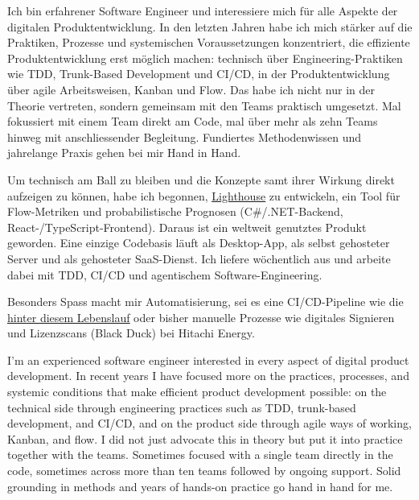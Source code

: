 {
}


\begin{cvparagraph}
\sloppy

{
	Ich bin erfahrener Software Engineer und interessiere mich für alle Aspekte der digitalen Produktentwicklung. In den letzten Jahren habe ich mich stärker auf die Praktiken, Prozesse und systemischen Voraussetzungen konzentriert, die effiziente Produktentwicklung erst möglich machen: technisch über Engineering-Praktiken wie TDD, Trunk-Based Development und CI/CD, in der Produktentwicklung über agile Arbeitsweisen, Kanban und Flow. Das habe ich nicht nur in der Theorie vertreten, sondern gemeinsam mit den Teams praktisch umgesetzt. Mal fokussiert mit einem Team direkt am Code, mal über mehr als zehn Teams hinweg mit anschliessender Begleitung. Fundiertes Methodenwissen und jahrelange Praxis gehen bei mir Hand in Hand.

	Um technisch am Ball zu bleiben und die Konzepte samt ihrer Wirkung direkt aufzeigen zu können, habe ich begonnen, \underline{\href{https://letpeople.work/lighthouse}{Lighthouse}} zu entwickeln, ein Tool für Flow-Metriken und probabilistische Prognosen (C\#/.NET-Backend, React-/TypeScript-Frontend). Daraus ist ein weltweit genutztes Produkt geworden. Eine einzige Codebasis läuft als Desktop-App, als selbst gehosteter Server und als gehosteter SaaS-Dienst. Ich liefere wöchentlich aus und arbeite dabei mit TDD, CI/CD und agentischem Software-Engineering.

	Besonders Spass macht mir Automatisierung, sei es eine CI/CD-Pipeline wie die \underline{\href{https://github.com/huserben/cv/actions}{hinter diesem Lebenslauf}} oder bisher manuelle Prozesse wie digitales Signieren und Lizenzscans (Black Duck) bei Hitachi Energy.
}
{
	I'm an experienced software engineer interested in every aspect of digital product development. In recent years I have focused more on the practices, processes, and systemic conditions that make efficient product development possible: on the technical side through engineering practices such as TDD, trunk-based development, and CI/CD, and on the product side through agile ways of working, Kanban, and flow. I did not just advocate this in theory but put it into practice together with the teams. Sometimes focused with a single team directly in the code, sometimes across more than ten teams followed by ongoing support. Solid grounding in methods and years of hands-on practice go hand in hand for me.

}
\end{cvparagraph}

